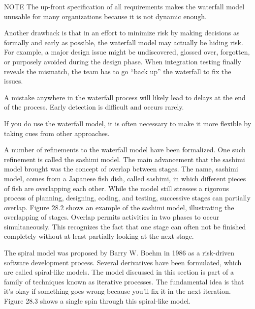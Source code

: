 \begin{myNotic}{NOTE}
The up-front specification of all requirements makes the waterfall model unusable for many organizations because it is not dynamic enough.
\end{myNotic}

Another drawback is that in an effort to minimize risk by making decisions as formally and early as possible, the waterfall model may actually be hiding risk. For example, a major design issue might be undiscovered, glossed over, forgotten, or purposely avoided during the design phase. When integration testing finally reveals the mismatch, the team has to go “back up” the waterfall to fix the issues.

A mistake anywhere in the waterfall process will likely lead to delays at the end of the process. Early detection is difficult and occurs rarely.

If you do use the waterfall model, it is often necessary to make it more flexible by taking cues from other approaches.


A number of refinements to the waterfall model have been formalized. One such refinement is called the sashimi model. The main advancement that the sashimi model brought was the concept of overlap between stages. The name, sashimi model, comes from a Japanese fish dish, called sashimi, in which different pieces of fish are overlapping each other. While the model still stresses a rigorous process of planning, designing, coding, and testing, successive stages can partially overlap. Figure 28.2 shows an example of the sashimi model, illustrating the overlapping of stages. Overlap permits activities in two phases to occur simultaneously. This recognizes the fact that one stage can often not be finished completely without at least partially looking at the next stage.



The spiral model was proposed by Barry W. Boehm in 1986 as a risk-driven software development process. Several derivatives have been formulated, which are called spiral-like models. The model discussed in this section is part of a family of techniques known as iterative processes. The fundamental idea is that it’s okay if something goes wrong because you’ll fix it in the next iteration. Figure 28.3 shows a single spin through this spiral-like model.

